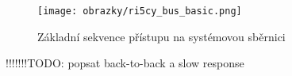 \begin{figure}[!h]
  \begin{center}
    \texttt{[image: obrazky/ri5cy\_bus\_basic.png]}
  \end{center}
  \caption{Základní sekvence přístupu na systémovou sběrnici \cite{ri5cy}}
	\label{fig:ri5cy_bus_basic}
\end{figure}

!!!!!!!TODO: popsat back-to-back a slow response